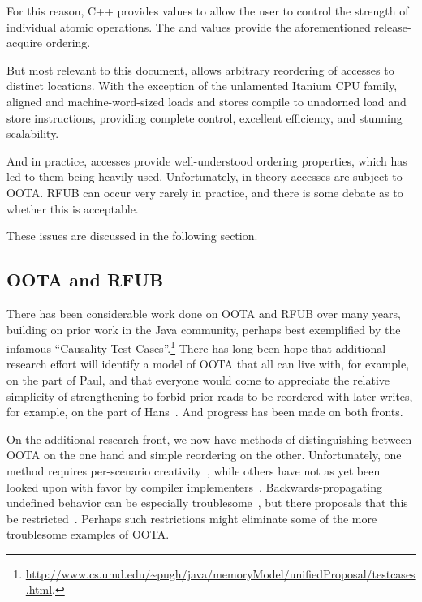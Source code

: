 \documentclass[10]{article}
\begin{document}
For this reason, C++ provides   values to
allow the user to control the strength of individual atomic operations.
The  and  values
provide the aforementioned release-acquire ordering.

But most relevant to this document,  allows
arbitrary reordering of accesses to distinct locations.
With the exception of the unlamented Itanium CPU family, aligned and
machine-word-sized  loads and stores compile
to unadorned load and store instructions, providing complete control,
excellent efficiency, and stunning scalability.

And in practice,  accesses provide well-understood
ordering properties, which has led to them being heavily used.
Unfortunately, in theory  accesses are subject
to OOTA.
RFUB can occur very rarely in practice, and there is some debate as to
whether this is acceptable.

These issues are discussed in the following section.

\subsection{OOTA and RFUB}
\label{sec:OOTA and RFUB}

There has been considerable work done on OOTA and RFUB over many years,
building on prior work in the Java community, perhaps best exemplified
by the infamous ``Causality Test Cases''.\footnote{
	\url{http://www.cs.umd.edu/~pugh/java/memoryModel/unifiedProposal/testcases.html}.}
There has long been hope that additional research effort will identify
a model of OOTA that all can live with, for example, on the part of Paul,
and that everyone would come to appreciate the relative simplicity of
strengthening  to forbid prior reads to be
reordered with later writes, for example, on the part of
Hans~\cite{Boehm:2014:OGA:2618128.2618134,HansBoehm2019OOTArevisitedAgain,Lahav:2017:RSC:3062341.3062352}.
And progress has been made on both fronts.

On the additional-research front, we now have methods of distinguishing
between OOTA on the one hand and simple reordering on the other.
Unfortunately, one method requires per-scenario
creativity~\cite{PaulEMcKenney2016OOTA},
while others have not as yet been looked upon with favor by compiler
implementers~\cite{Lahav:2017:RSC:3062341.3062352,Sinclair:2017:CAR:3079856.3080206,Lee:10.1145/3385412.3386010,MarkBatty2019ModularRelaxedDependenciesOOTA}.
Backwards-propagating undefined behavior can be especially
troublesome~\cite{DavidGoldblatt2019NoElegantOOTAfix},
but there proposals that this be
restricted~\cite{HansBoehm2020UBalternatives}.
Perhaps such restrictions might eliminate some of the more troublesome
examples of OOTA.
\end{document}
